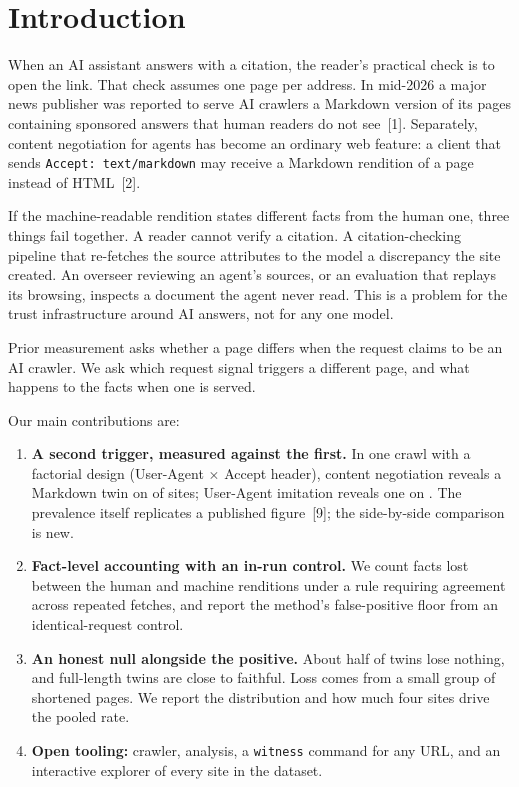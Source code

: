 \documentclass[10pt,a4paper]{article}
\newcommand{\hdr}[1]{\texttt{#1}}
\begin{document}
\section{Introduction}
When an AI assistant answers with a citation, the reader's practical check is to open the link. That check assumes one page per address. In mid-2026 a major news publisher was reported to serve AI crawlers a Markdown version of its pages containing sponsored answers that human readers do not see~[1]. Separately, content negotiation for agents has become an ordinary web feature: a client that sends \hdr{Accept: text/markdown} may receive a Markdown rendition of a page instead of HTML~[2].

If the machine-readable rendition states different facts from the human one, three things fail together. A reader cannot verify a citation. A citation-checking pipeline that re-fetches the source attributes to the model a discrepancy the site created. An overseer reviewing an agent's sources, or an evaluation that replays its browsing, inspects a document the agent never read. This is a problem for the trust infrastructure around AI answers, not for any one model.

Prior measurement asks whether a page differs when the request claims to be an AI crawler. We ask which request signal triggers a different page, and what happens to the facts when one is served.

Our main contributions are:
\begin{enumerate}
\item \textbf{A second trigger, measured against the first.} In one crawl with a factorial design (User-Agent $\times$ Accept header), content negotiation reveals a Markdown twin on \AccTwinP{} of sites; User-Agent imitation reveals one on \UaTwinP. The prevalence itself replicates a published figure~[9]; the side-by-side comparison is new.
\item \textbf{Fact-level accounting with an in-run control.} We count facts lost between the human and machine renditions under a rule requiring agreement across repeated fetches, and report the method's false-positive floor from an identical-request control.
\item \textbf{An honest null alongside the positive.} About half of twins lose nothing, and full-length twins are close to faithful. Loss comes from a small group of shortened pages. We report the distribution and how much four sites drive the pooled rate.
\item \textbf{Open tooling:} crawler, analysis, a \texttt{witness} command for any URL, and an interactive explorer of every site in the dataset.
\end{enumerate}
\end{document}
